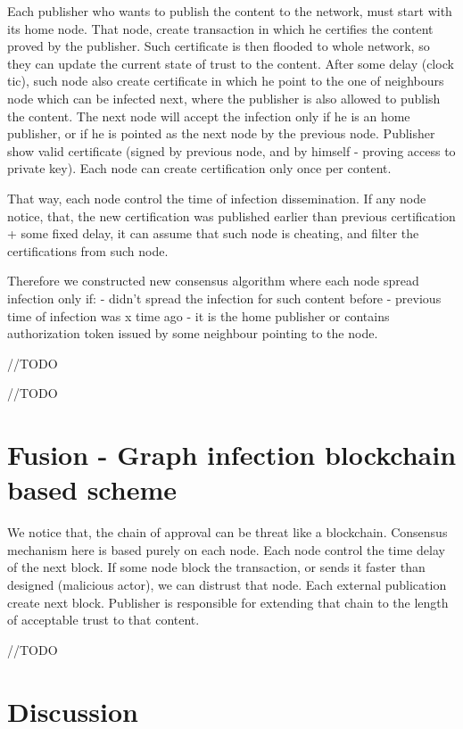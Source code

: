 \documentclass[nostrict]{szablonPG}
\begin{document}
Each publisher who wants to publish the content to the network, must start with its home node. That node, create transaction in which he certifies the content proved by the publisher. Such certificate is then flooded to whole network, so they can update the current state of trust to the content. After some delay (clock tic), such node also create certificate in which he point to the one of neighbours node which can be infected next, where the publisher is also allowed to publish the content. The next node will accept the infection only if he is an home publisher, or if he is pointed as the next node by the previous node. Publisher show valid certificate (signed by previous node, and by himself - proving access to private key). Each node can create certification only once per content. 

That way, each node control the time of infection dissemination. If any node notice, that, the new certification was published earlier than previous certification + some fixed delay, it can assume that such node is cheating, and filter the certifications from such node.

Therefore we constructed new consensus algorithm where each node spread infection only if:
- didn't spread the infection for such content before
- previous time of infection was x time ago
- it is the home publisher or contains authorization token issued by some neighbour pointing to the node.

//TODO



//TODO

\section{Fusion - Graph infection blockchain based scheme}
We notice that, the chain of approval can be threat like a blockchain. Consensus mechanism here is based purely on each node. Each node control the time delay of the next block. If some node block the transaction, or sends it faster than designed (malicious actor), we can distrust that node. Each external publication create next block. Publisher is responsible for extending that chain to the length of acceptable trust to that content.

//TODO

\section{Discussion}



\end{document}
